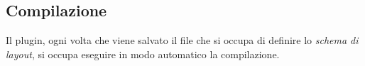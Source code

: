 \subsection{Compilazione} 
Il plugin, ogni volta che viene salvato il file che si occupa di definire lo
\emph{schema di layout}, si occupa eseguire in modo automatico la compilazione.
